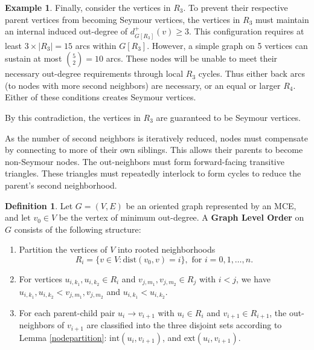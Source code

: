 \documentclass[AMS, Times1COL]{article} %
\theoremstyle{definition}
\newtheorem{definition}{Definition}[section]
\newtheorem{example}{Example}[section]
\begin{document}
\begin{example}
			Finally, consider the vertices in $R_3$. To prevent their respective parent vertices from becoming Seymour vertices, the vertices in $R_3$ must maintain an internal induced out-degree of $d^+_{G[R_3]}(v) \ge 3$. This configuration requires at least $3 \times |R_3| = 15$ arcs within $G[R_3]$. However, a simple graph on 5 vertices can sustain at most $\binom{5}{2} = 10$ arcs. These nodes will be unable to meet their necessary out-degree requirements through local $R_3$ cycles. Thus either back arcs (to nodes with more second neighbors) are necessary, or an equal or larger $R_4$. Either of these conditions creates Seymour vertices.
			
			By this contradiction, the vertices in $R_3$ are guaranteed to be Seymour vertices.
		\end{example}
		\noindent\hrulefill
	\vspace{2.8ex}
	
	As the number of second neighbors is iteratively reduced, nodes must compensate by connecting to more of their own siblings. This allows their parents to become non-Seymour nodes. The out-neighbors must form forward-facing transitive triangles. These triangles must repeatedly interlock to form cycles to reduce the parent's second neighborhood.
	
	\begin{definition}\label{glover1}
		Let $G = (V,E)$ be an oriented graph represented by an MCE, and let $v_0 \in V$ be the vertex of minimum out-degree. A \textbf{Graph Level Order} on $G$ consists of the following structure:
		\begin{enumerate}
			\item Partition the vertices of $V$ into rooted neighborhoods $$R_i=\{v \in V : \text{dist}(v_0,v)=i\}, \text{ for } i=0,1,\dots,n.$$
			\item For vertices $u_{i,k_1}, u_{i,k_2} \in R_i$ and $v_{j,m_1}, v_{j,m_2} \in R_j$ with $i<j$, we have $u_{i,k_1}, u_{i,k_2}<v_{j,m_1}, v_{j,m_2}$ and $u_{i,k_1} < u_{i,k_2}$.			
			\item For each parent-child pair $u_i \to v_{i+1}$ with $u_i \in R_i$ and $v_{i+1} \in R_{i+1}$, the out-neighbors of $v_{i+1}$ are classified into the three disjoint sets according to Lemma \ref{nodepartition}: $\text{int}(u_i,v_{i+1})$, and $\text{ext}(u_i,v_{i+1})$.
		\end{enumerate}
	\end{definition}	
	
\end{document}
